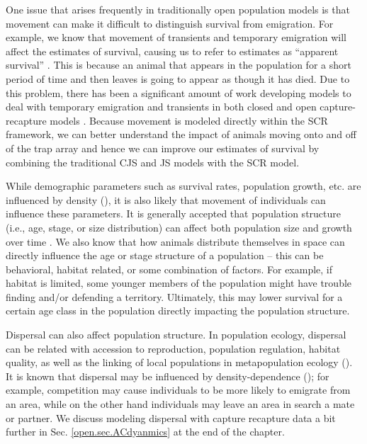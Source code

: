 One issue that arises frequently in traditionally open population
models is that movement can make it difficult to distinguish survival
from emigration.  For example, we know that movement of transients and
temporary emigration will affect the estimates of survival, causing us
to refer to estimates as ``apparent survival''
\citep{lebreton_etal:1992}.  This is because an animal that appears
in the population for a short period of time and then leaves is going
to appear as though it has died.  Due to this problem, there has been
a significant amount of work developing models to deal with temporary
emigration and transients in both closed and open capture-recapture
models \citep{kendall_etal:1997, pradel_hines:1997, hines_etal:2003,
  clavel_etal:2008, gilroy_etal:2012,chandler_etal:2011}.  
Because movement is modeled %
directly within the SCR framework, we can better understand the impact
of animals moving onto and off of the trap array and hence we can
improve our estimates of survival by combining the traditional CJS and
JS models with the SCR model.

While demographic parameters such as survival rates, population
growth, etc. are influenced by density (\cite{fowler:1981,
  murdoch:1994, saether_etal:2002}), it is also likely that movement
of individuals can influence these parameters.  It is generally
accepted that population structure (i.e., age, stage, or size
distribution) can affect both population size and growth over time
\cite{caswell_werner:1978}.  We also know that how animals distribute
themselves in space can directly influence the age or stage structure
of a population -- this can be behavioral, habitat related, or some
combination of factors.  For example, if habitat is limited, some
younger members of the population might have trouble finding and/or
defending a territory.  Ultimately, this may lower survival for a
certain age class in the population directly impacting the population
structure.

Dispersal can also affect population structure.  In population
ecology, dispersal can be related with accession to reproduction,
population regulation, habitat quality, as well as the linking of
local populations in metapopulation ecology (\cite{clobert_etal:2001,
  ovaskainen:2004, ovaskainen_etal:2008}).  It is known that dispersal
may be influenced by density-dependence (\cite{matthysen:2005}); for
example, competition may cause individuals to be more likely to
emigrate from an area, while on the other hand individuals may leave
an area in search a mate or partner.  We discuss modeling dispersal
with capture recapture data a bit further in
Sec. \ref{open.sec.ACdyanmics} at the end of the chapter.



